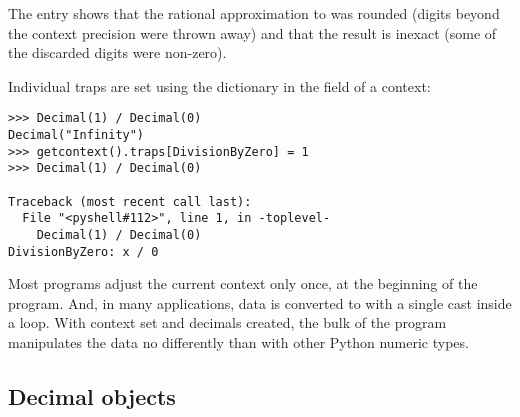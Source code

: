 The  entry shows that the rational approximation to 
was rounded (digits beyond the context precision were thrown away) and that
the result is inexact (some of the discarded digits were non-zero).

Individual traps are set using the dictionary in the 
field of a context:

\begin{verbatim}
>>> Decimal(1) / Decimal(0)
Decimal("Infinity")
>>> getcontext().traps[DivisionByZero] = 1
>>> Decimal(1) / Decimal(0)

Traceback (most recent call last):
  File "<pyshell#112>", line 1, in -toplevel-
    Decimal(1) / Decimal(0)
DivisionByZero: x / 0
\end{verbatim}

Most programs adjust the current context only once, at the beginning of the
program.  And, in many applications, data is converted to  with
a single cast inside a loop.  With context set and decimals created, the bulk
of the program manipulates the data no differently than with other Python
numeric types.



\subsection{Decimal objects \label{decimal-decimal}}

